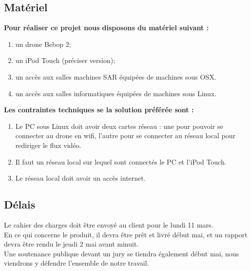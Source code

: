 \documentclass{article}
\begin{document}
	\subsection{Matériel}
		\begin{flushleft}
	        \textbf{Pour réaliser ce projet nous disposons du matériel suivant :}
	    \end{flushleft}
		\begin{enumerate}
        \item un drone Bebop 2;
        \item un iPod Touch (préciser version);
        \item un accès aux salles machines SAR équipées de machines sous OSX.
        \item un accès aux salles informatiques équipées de machines sous Linux.
        \end{enumerate}
        \begin{flushleft}
	        \textbf{Les contraintes techniques se la solution préférée sont :}
	    \end{flushleft}
		\begin{enumerate}
        \item Le PC sous Linux doit avoir deux cartes réseau : une pour pouvoir se connecter au drone en wifi, l'autre pour se connecter au réseau local pour rediriger le flux vidéo.
        \item Il faut un réseau local sur lequel sont connectés le PC et l'iPod Touch.
        \item Le réseau local doit avoir un accès internet.
        \end{enumerate}
	\subsection{Délais}
		Le cahier des charges doit être envoyé au client pour le lundi 11 mars.\\
		En ce qui concerne le produit, il devra être prêt et livré début mai, et un rapport devra être rendu le jeudi 2 mai avant minuit.\\
		Une soutenance publique devant un jury se tiendra également début mai, nous viendrons y défendre l'ensemble de notre travail.\\
		
\end{document}
